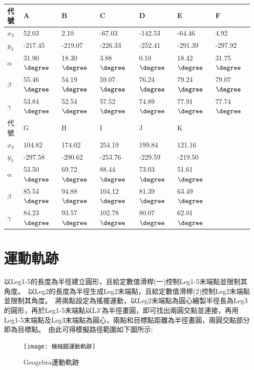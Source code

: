 \begin{table}[htbp]
  \large
  \setlength{\tabcolsep}{0.7cm}
  \begin{tabular}{|p{2cm}|p{2cm}|p{2cm}|p{2cm}|p{2cm}|p{2cm}|}
    \hline
    代號 & A & B & C & D & E & F \\
    \hline
    $x_3$ & 52.03 & 2.10 & -67.03 & -142.53 & -64.46 & 4.92  \\
    \hline
    $y_3$ & -217.45 & -219.07 & -226.33 & -252.41 & -291.39 & -297.92  \\
    \hline
    $\alpha$ & 31.90$\degree$ & 18.30$\degree$ & 3.88$\degree$ & 0.10$\degree$ & 18.42$\degree$ & 31.75$\degree$  \\
    \hline
    $\beta$ & 55.46$\degree$ & 54.19$\degree$ & 59.07$\degree$ & 76.24$\degree$ & 79.24$\degree$ & 79.07$\degree$  \\
    \hline
    $\gamma$ & 53.84$\degree$ & 52.54$\degree$ & 57.52$\degree$ & 74.89$\degree$ & 77.91$\degree$ & 77.74$\degree$ \\
    \hline
    代號 & G & H & I & J & K & ~ \\
    \hline
    $x_3$ & 104.82 & 174.02 & 254.19 & 199.84 & 121.16 & ~\\
    \hline
    $y_3$ & -297.58 & -290.62 & -253.76 & -229.59 & -219.50 & ~\\
    \hline
    $\alpha$ & 53.50$\degree$ & 69.72$\degree$ & 88.44$\degree$ & 73.03$\degree$ & 51.61$\degree$ & ~\\
    \hline
    $\beta$ & 85.54$\degree$ & 94.88$\degree$ & 104.12$\degree$ & 81.39$\degree$ & 63.49$\degree$ & ~\\
    \hline
    $\gamma$ & 84.23$\degree$ & 93.57$\degree$ & 102.78$\degree$ & 80.07$\degree$ & 62.01$\degree$ & ~\\
    \hline
  \end{tabular}
\end{table}

\section{運動軌跡}
以Leg1-5的長度為半徑建立圓形，且給定數值滑桿(一)控制Leg1-5末端點並限制其角度。\
以Leg2的長度為半徑生成Leg2末端點，且給定數值滑桿(2)控制Leg2末端點並限制其角度。\
將兩點設定為搖擺運動，以Leg2末端點為圓心繪製半徑長為Leg3的圓形，再於Leg1-5末端點以L3’為半徑畫圓，即可找出兩圓交點並連接，再用Leg1-5末端點及Leg3末端點為圓心，兩點和目標點距離為半徑畫圓，兩圓交點部分即為目標點。\
由此可得模擬路徑範圍如下圖所示:\\
\begin{figure}[hbt!]
\begin{center}
\texttt{[image: 機械腿運動軌跡]}
\caption{\Large Geogebra運動軌跡}\label{機械腿運動軌跡}
\end{center}
\end{figure}
\newpage
